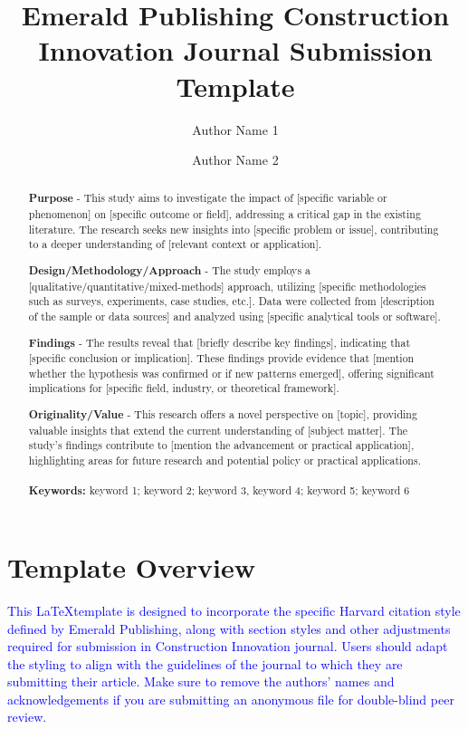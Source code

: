 \documentclass{article}
\author[1]{Author Name 1}
\author[2]{Author Name 2}
\affil[1]{Institute, Department, City, Country
email (corr. author)}
\affil[2]{Institute, Department, City, Country}
\title{Emerald Publishing Construction Innovation Journal Submission Template}
\begin{document}
\maketitle


\begin{abstract}
\textbf{Purpose} - This study aims to investigate the impact of [specific variable or phenomenon] on [specific outcome or field], addressing a critical gap in the existing literature. The research seeks new insights into [specific problem or issue], contributing to a deeper understanding of [relevant context or application].

\textbf{Design/Methodology/Approach} - The study employs a [qualitative/quantitative/mixed-methods] approach, utilizing [specific methodologies such as surveys, experiments, case studies, etc.]. Data were collected from [description of the sample or data sources] and analyzed using [specific analytical tools or software].

\textbf{Findings} - The results reveal that [briefly describe key findings], indicating that [specific conclusion or implication]. These findings provide evidence that [mention whether the hypothesis was confirmed or if new patterns emerged], offering significant implications for [specific field, industry, or theoretical framework].

\textbf{Originality/Value} - This research offers a novel perspective on [topic], providing valuable insights that extend the current understanding of [subject matter]. The study’s findings contribute to [mention the advancement or practical application], highlighting areas for future research and potential policy or practical applications. 
\\
\\
\textbf{Keywords:} keyword 1; keyword 2; keyword 3, keyword 4; keyword 5; keyword 6
\end{abstract}
\linenumbers

\section*{Template Overview}
\textcolor{blue}{This \LaTeX template is designed to incorporate the specific Harvard citation style defined by Emerald Publishing, along with section styles and other adjustments required for submission in Construction Innovation journal.
Users should adapt the styling to align with the guidelines of the journal to which they are submitting their article. Make sure to remove the authors' names and acknowledgements if you are submitting an anonymous file for double-blind peer review.}
\end{document}
